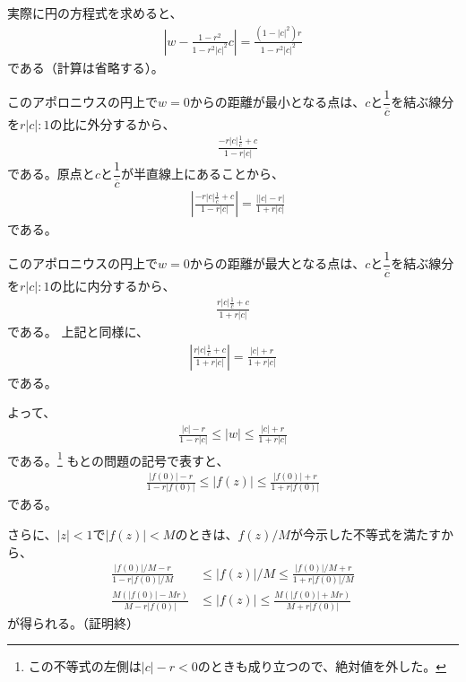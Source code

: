 実際に円の方程式を求めると、
\begin{align*}
    \left|w-\frac{1-r^2}{1-r^2|c|^2}c\right|
    =\frac{(1-|c|^2)r}{1-r^2|c|^2}
\end{align*}
である（計算は省略する）。

このアポロニウスの円上で$w=0$からの距離が最小となる点は、$c$と$\dfrac{1}{\overline{c}}$を結ぶ線分を$r|c|:1$の比に外分するから、
\begin{align*}
    &\frac{-r|c|\frac{1}{\overline{c}}+c}{1-r|c|}
\end{align*}
である。原点と$c$と$\dfrac{1}{\overline{c}}$が半直線上にあることから、
\begin{align*}
    &\left|\frac{-r|c|\frac{1}{\overline{c}}+c}{1-r|c|}\right|
    =\frac{\left||c|-r\right|}{1+r|c|}
\end{align*}
である。

このアポロニウスの円上で$w=0$からの距離が最大となる点は、$c$と$\dfrac{1}{\overline{c}}$を結ぶ線分を$r|c|:1$の比に内分するから、
\begin{align*}
    \frac{r|c|\frac{1}{\overline{c}}+c}{1+r|c|}
\end{align*}
である。
上記と同様に、
\begin{align*}
    \left|\frac{r|c|\frac{1}{\overline{c}}+c}{1+r|c|}\right|
    =\frac{|c|+r}{1+r|c|} 
\end{align*}
である。

よって、
\begin{align*}
    \frac{|c|-r}{1-r|c|}
    \le|w|
    \le\frac{|c|+r}{1+r|c|}
\end{align*}
である。\footnote{この不等式の左側は$|c|-r<0$のときも成り立つので、絶対値を外した。}
もとの問題の記号で表すと、
\begin{align*}
    \frac{|f(0)|-r}{1-r|f(0)|}
    \le|f(z)|
    \le\frac{|f(0)|+r}{1+r|f(0)|}
\end{align*}
である。

さらに、$|z|<1$で$|f(z)|<M$のときは、$f(z)/M$が今示した不等式を満たすから、
\begin{align*}
    \frac{|f(0)|/M-r}{1-r|f(0)|/M}
    &\le|f(z)|/M
    \le\frac{|f(0)|/M+r}{1+r|f(0)|/M}\\
    \frac{M(|f(0)|-Mr)}{M-r|f(0)|}
    &\le|f(z)|
    \le\frac{M(|f(0)|+Mr)}{M+r|f(0)|}
\end{align*}
が得られる。（証明終）

